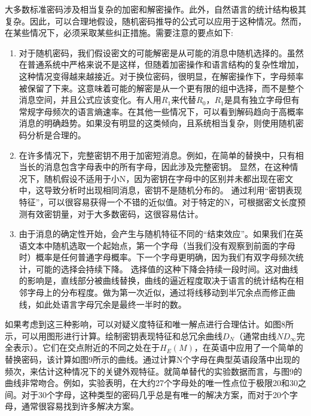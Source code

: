 \documentclass[]{article}
\begin{document}
大多数标准密码涉及相当复杂的加密和解密操作。此外，自然语言的统计结构极其复杂。因此，可以合理地假设，随机密码推导的公式可以应用于这种情况。然而，在某些情况下，必须采取某些纠正措施。需要注意的要点如下:
\begin{enumerate}
	\item 对于随机密码，我们假设密文的可能解密是从可能的消息中随机选择的。虽然在普通系统中严格来说不是这样，但随着加密操作和语言结构的复杂性增加，这种情况变得越来越接近。对于换位密码，很明显，在解密操作下，字母频率被保留了下来。这意味着可能的解密是从一个更有限的组中选择，而不是整个消息空间，并且公式应该变化。有人用$R_1$来代替$R_0$，$R_1$是具有独立字母但有常规字母频次的语言熵速率。在其他一些情况下，可以看到解码趋向于高概率消息的明确趋势。如果没有明显的这类倾向，且系统相当复杂，则使用随机密码分析是合理的。
	\item 在许多情况下，完整密钥不用于加密短消息。例如，在简单的替换中，只有相当长的消息包含字母表中的所有字母，因此涉及完整密钥。
	显然，在这种情况下，随机假设不适用于小N，因为密钥在字母中的区别并未都出现在密文中，这导致分析时出现相同消息，密钥不是随机分布的。
	通过利用“密钥表现特征”，可以很容易获得一个不错的近似值。对于特定的N，可根据密文长度预测有效密钥量，对于大多数密码，这很容易估计。
	\item 由于消息的确定性开始，会产生与随机特征不同的“结束效应”。如果我们在英语文本中随机选取一个起始点，第一个字母（当我们没有观察到前面的字母时）概率是任何普通字母概率。下一个字母更明确，因为我们有双字母频次统计，可能的选择会持续下降。
	选择值的这种下降会持续一段时间。这对曲线的影响是，直线部分被曲线替换，曲线的逼近程度取决于语言的统计结构在相邻字母上的分布程度。做为第一次近似，通过将线移动到半冗余点而修正曲线，如此处语言字母冗余是最终一半时的数。
\end{enumerate}

如果考虑到这三种影响，可以对疑义度特征和唯一解点进行合理估计。如图8所示，可以用图形进行计算。绘制密钥表现特征和总冗余曲线$D_N$（通常由线$ND_{\infty}$完全表示）。它们在交点附近的不同之处在于$H_E(M)$，在英语中应用了一个简单的替换密码，该计算如图9所示的曲线。通过计算N个字母在典型英语段落中出现的频次，来估计这种情况下的关键外观特征。就简单替代的实验数据而言，与图9的曲线非常吻合。例如，实验表明，在大约27个字母处的唯一性点位于极限20和30之间。对于30个字母，这种类型的密码几乎总是有唯一的解决方案，而对于20个字母，通常很容易找到许多解决方案。
\end{document}
